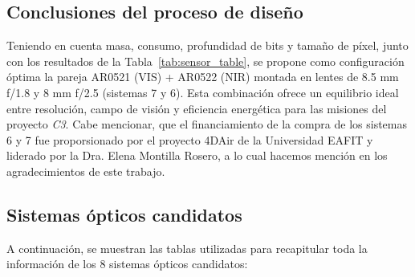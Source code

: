 \subsection{Conclusiones del proceso de diseño}

\noindent Teniendo en cuenta masa, consumo, profundidad de bits y tamaño de píxel, junto con los resultados de la Tabla~\ref{tab:sensor_table}, se propone como configuración óptima la pareja AR0521 (VIS) + AR0522 (NIR) montada en lentes de 8.5 mm f/1.8 y 8 mm f/2.5 (sistemas 7 y 6). Esta combinación ofrece un equilibrio ideal entre resolución, campo de visión y eficiencia energética para las misiones del proyecto \textit{C3}. Cabe mencionar, que el financiamiento de la compra de los sistemas 6 y 7 fue proporsionado por el proyecto 4DAir de la Universidad EAFIT y liderado por la Dra. Elena Montilla Rosero, a lo cual hacemos mención en los agradecimientos de este trabajo.\\

\subsection{Sistemas ópticos candidatos}%
\label{ap:sistemas_candidatos} 


A continuación, se muestran las tablas utilizadas para recapitular toda la información de los 8 sistemas ópticos candidatos:

